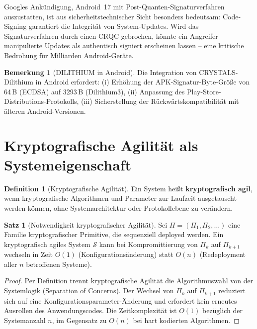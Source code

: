 ﻿\documentclass[a4paper,12pt]{article}
\theoremstyle{definition}
\newtheorem{definition}{Definition}[section]
\newtheorem{bemerkung}{Bemerkung}[section]
\newtheorem{satz}{Satz}[section]
\begin{document}
Googles Ankündigung, Android~17 mit Post-Quanten-Signaturverfahren auszustatten,
ist aus sicherheitstechnischer Sicht besonders bedeutsam: Code-Signing garantiert
die Integrität von System-Updates. Wird das Signaturverfahren durch einen CRQC
gebrochen, könnte ein Angreifer manipulierte Updates als authentisch signiert
erscheinen lassen -- eine kritische Bedrohung für Milliarden Android-Geräte.

\begin{bemerkung}[DILITHIUM in Android]
Die Integration von CRYSTALS-Dilithium in Android erfordert:
(i) Erhöhung der APK-Signatur-Byte-Größe von 64\,B (ECDSA) auf 3293\,B (Dilithium3),
(ii) Anpassung des Play-Store-Distributions-Protokolls,
(iii) Sicherstellung der Rückwärtskompatibilität mit älteren Android-Versionen.
\end{bemerkung}

\section{Kryptografische Agilit\"at als Systemeigenschaft}

\begin{definition}[Kryptografische Agilit\"at]
Ein System heißt \textbf{kryptografisch agil}, wenn kryptografische Algorithmen
und Parameter zur Laufzeit ausgetauscht werden können, ohne Systemarchitektur
oder Protokollebene zu verändern.
\end{definition}

\begin{satz}[Notwendigkeit kryptografischer Agilit\"at]
Sei $\Pi = (\Pi_1, \Pi_2, \ldots)$ eine Familie kryptografischer Primitive,
die sequenziell deployed werden. Ein kryptografisch agiles System $\mathcal{S}$
kann bei Kompromittierung von $\Pi_k$ auf $\Pi_{k+1}$ wechseln in Zeit $O(1)$
(Konfigurationsänderung) statt $O(n)$ (Redeployment aller $n$ betroffenen Systeme).
\end{satz}

\begin{proof}
Per Definition trennt kryptografische Agilität die Algorithmuswahl von der
Systemlogik (Separation of Concerns). Der Wechsel von $\Pi_k$ auf $\Pi_{k+1}$
reduziert sich auf eine Konfigurationsparameter-Änderung und erfordert kein
erneutes Ausrollen des Anwendungscodes. Die Zeitkomplexität ist $O(1)$
bezüglich der Systemanzahl $n$, im Gegensatz zu $O(n)$ bei hart kodierten
Algorithmen.
\end{proof}
\end{document}
